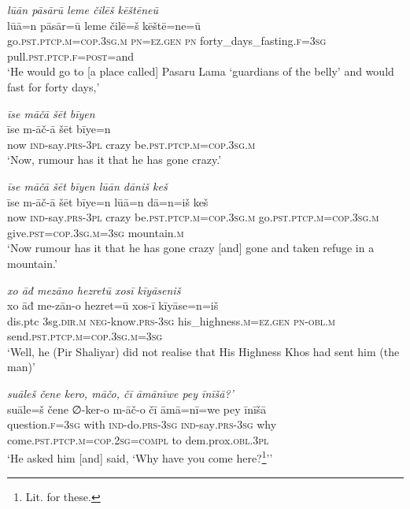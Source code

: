 \ea \label{ŽP.122}
\textit{lūān pāsārū leme čilēš kēštēneū} \\ 
\gll lūā=n pāsār=ū leme čilē=š kēštē=ne=ū \\ 
 go\textsc{.pst}\textsc{.ptcp}\textsc{.m}\textsc{=cop}\textsc{.3sg}\textsc{.m} \textsc{pn}\textsc{\textsc{=ez.gen}} \textsc{pn} forty\_days\_fasting\textsc{.f}\textsc{=3sg} pull\textsc{.pst}\textsc{.ptcp}\textsc{.f}\textsc{=\textsc{post}}=and \\ 
\glt `He would go to [a place called] Pasaru Lama ‘guardians of the belly’ and would fast for forty days,'
\z 
 
\ea \label{ŽP.127}
\textit{īse māčā šēt bīyen} \\ 
\gll īse m-āč-ā šēt bīye=n \\ 
 now \textsc{ind-}say\textsc{.prs}\textsc{-3pl} crazy be\textsc{.pst}\textsc{.ptcp}\textsc{.m}\textsc{=cop}\textsc{.3sg}\textsc{.m} \\ 
\glt `Now, rumour has it that he has gone crazy.'
\z 
 
\ea \label{ŽP.128}
\textit{īse māčā šēt bīyen lūān dāniš keš} \\ 
\gll īse m-āč-ā šēt bīye=n lūā=n dā=n=iš keš \\ 
 now \textsc{ind-}say\textsc{.prs}\textsc{-3pl} crazy be\textsc{.pst}\textsc{.ptcp}\textsc{.m}\textsc{=cop}\textsc{.3sg}\textsc{.m} go\textsc{.pst}\textsc{.ptcp}\textsc{.m}\textsc{=cop}\textsc{.3sg}\textsc{.m} give\textsc{.pst}\textsc{=cop}\textsc{.3sg}\textsc{.m}\textsc{=3sg} mountain\textsc{.m} \\ 
\glt `Now rumour has it that he has gone crazy [and] gone and taken refuge in a mountain.'
\z 
 
\ea \label{ŽP.134}
\textit{xo āđ mezāno hezretū xosī kīyāseniš} \\ 
\gll xo āđ me-zān-o hezret=ū xos-ī kīyāse=n=iš \\ 
 dis.ptc 3sg\textsc{.dir}\textsc{.m} \textsc{neg-}know\textsc{.prs}\textsc{-3sg} his\_highness\textsc{.m}\textsc{\textsc{=ez.gen}} \textsc{pn}\textsc{-obl}\textsc{.m} send\textsc{.pst}\textsc{.ptcp}\textsc{.m}\textsc{=cop}\textsc{.3sg}\textsc{.m}\textsc{=3sg} \\ 
\glt `Well, he (Pir Shaliyar) did not realise that His Highness Khos had sent him (the man)'
\z 
 
\ea \label{ŽP.135}
\textit{suāleš čene kero, māčo, čī āmānīwe pey īnīšā?’} \\ 
\gll suāle=š čene ∅-ker-o m-āč-o čī āmā=nī=we pey īnīšā \\ 
 question\textsc{.f}\textsc{=3sg} with \textsc{ind-}do\textsc{.prs}\textsc{-3sg} \textsc{ind-}say\textsc{.prs}\textsc{-3sg} why come\textsc{.pst}\textsc{.ptcp}\textsc{.m}\textsc{=cop}\textsc{.\textsc{2sg}}\textsc{=compl} to dem.prox\textsc{.obl}\textsc{.3pl} \\ 
\glt `He asked him [and] said, ‘Why have you come here?\footnote{Lit. for these.}’'
\z 
 
